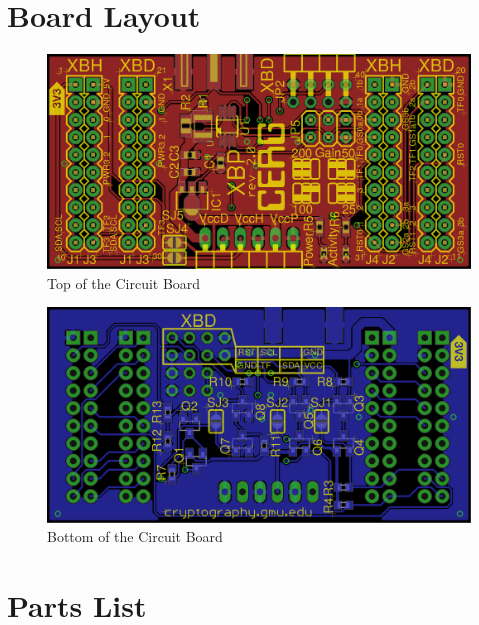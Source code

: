 \documentclass[twoside,11pt]{cergdoc}
\begin{document}
\begin{appendix}
\chapter{Board Layout}\label{sec:board}
\begin{figure}[ht]
  \begin{center}
    \includegraphics[scale=0.25]{figures/XBP-top}
    \caption{Top of the Circuit Board}
  \end{center}
\end{figure}

\begin{figure}[ht]
  \begin{center}
    \includegraphics[scale=0.25]{figures/XBP-bottom}
    \caption{Bottom of the Circuit Board}
  \end{center}
\end{figure}
\chapter{Parts List}\label{sec:parts}

\end{appendix}
\end{document}
